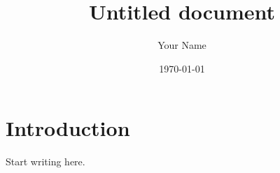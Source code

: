 \documentclass[11pt]{article}
\title{Untitled document}
\author{Your Name}
\date{\today}
\begin{document}
\maketitle

\section{Introduction}
Start writing here.
\end{document}
